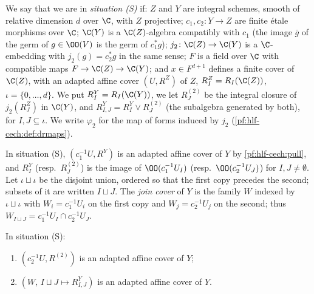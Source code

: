 \begin{definition}\label{pf:hlf-cech:def:sit}
We say that we are in \emph{situation (S)} if: $Z$ and $Y$ are integral schemes, smooth of relative dimension $d$ over $\C$, with $Z$
projective; $c_1,c_2\colon Y\to Z$ are finite \'etale morphisms over $\C$; $\C(Y)$ is a $\C(Z)$-algebra compatibly with $c_1$ (the image $\bar g$ of the
germ of $g\in\OO(V)$ is the germ of $c_1^*g$); $j_2\colon\C(Z)\to\C(Y)$ is a $\C$-embedding with $j_2(g)=c_2^*g$ in the same sense; $F$ is a field
over $\C$ with compatible maps $F\to\C(Z)\to\C(Y)$; and $x\in F^{d+1}$ defines a finite cover of $\C(Z)$, with an adapted affine cover
$(U,R^Z)$ of $Z$, $R^Z_I=R_I(\C(Z))$, $\iota=\{0,\dots,d\}$. We put $R^Y_I=R_I(\C(Y))$, we let $R^{(2)}_J$ be the integral closure of $j_2(R^Z_J)$ in
$\C(Y)$, and $R^{Y}_{I,J}=R^Y_I\vee R^{(2)}_J$ (the subalgebra generated by both), for $I,J\subseteq\iota$. We write $\varphi_2$ for the map of forms
induced by $j_2$ (\cref{pf:hlf-cech:def:drmaps}).
\end{definition}

In situation (S), $(c_1^{-1}U,R^Y)$ is an adapted affine cover of $Y$ by \cref{pf:hlf-cech:pull}, and $R^Y_I$ (resp.\ $R^{(2)}_J$) is the image of
$\OO(c_1^{-1}U_I)$ (resp.\ $\OO(c_2^{-1}U_J)$) for $I,J\ne\emptyset$. Let $\iota\sqcup\iota$ be the disjoint union, ordered so that the first copy
precedes the second; subsets of it are written $I\sqcup J$. The \emph{join cover} of $Y$ is the family $W$ indexed by $\iota\sqcup\iota$ with
$W_{i}=c_1^{-1}U_i$ on the first copy and $W_j=c_2^{-1}U_j$ on the second; thus $W_{I\sqcup J}=c_1^{-1}U_I\cap c_2^{-1}U_J$.

\begin{lemma}\label{pf:hlf-cech:joincover}
In situation (S):
\begin{enumerate}[label=(\alph*),nosep]
\item $(c_2^{-1}U,R^{(2)})$ is an adapted affine cover of $Y$;
\item $(W,\,I\sqcup J\mapsto R^Y_{I,J})$ is an adapted affine cover of $Y$.
\end{enumerate}
\end{lemma}

